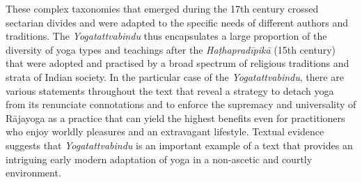 These complex taxonomies that emerged during the 17th century crossed sectarian divides and were adapted to the specific needs of different authors and traditions. The \textit{Yogatattvabindu} thus encapsulates a large proportion of the diversity of yoga types and teachings after the \textit{Haṭhapradīpikā} (15th century) that were adopted and practised by a broad spectrum of religious traditions and strata of Indian society. In the particular case of the \textit{Yogatattvabindu}, there are various statements throughout the text that reveal a strategy to detach yoga from its renunciate connotations and to enforce the supremacy and universality of Rājayoga as a practice that can yield the highest benefits even for practitioners who enjoy worldly pleasures and an extravagant lifestyle. Textual evidence suggests that \textit{Yogatattvabindu} is an important example of a text that provides an intriguing early modern adaptation of yoga in a non-ascetic and courtly environment.

